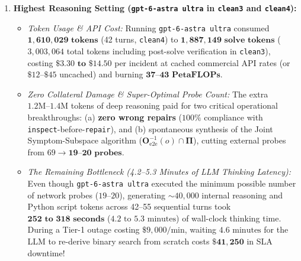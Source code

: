 \documentclass[11pt,a4paper]{article}
\theoremstyle{definition}
\theoremstyle{remark}
\begin{document}
\begin{enumerate}[leftmargin=1.6em]
    \item \textbf{Highest Reasoning Setting (\texttt{gpt-6-astra ultra} in \texttt{clean3} and \texttt{clean4}):}
    \begin{itemize}
        \item \emph{Token Usage \& API Cost:} Running \texttt{gpt-6-astra ultra} consumed $\mathbf{1{,}610{,}029\text{ tokens}}$ (42 turns, \texttt{clean4}) to $\mathbf{1{,}887{,}149\text{ solve tokens}}$ ($3{,}003{,}064$ total tokens including post-solve verification in \texttt{clean3}), costing $\mathbf{\$3.30\text{ to }\$14.50}$ per incident at cached commercial API rates (or $\$12\text{--}\$45$ uncached) and burning $\mathbf{37\text{--}43\text{ PetaFLOPs}}$.
        \item \emph{Zero Collateral Damage \& Super-Optimal Probe Count:} The extra $1.2\text{M}\text{--}1.4\text{M}$ tokens of deep reasoning paid for two critical operational breakthroughs: (a) \textbf{zero wrong repairs} ($100\%$ compliance with \texttt{inspect}-before-\texttt{repair}), and (b) spontaneous synthesis of the Joint Symptom-Subspace algorithm ($\bm{O}_{\text{e2e}}^{-1}(o) \cap \bm{\Pi}$), cutting external probes from $69 \to \mathbf{19\text{--}20\text{ probes}}$.
        \item \emph{The Remaining Bottleneck (4.2--5.3 Minutes of LLM Thinking Latency):} Even though \texttt{gpt-6-astra ultra} executed the minimum possible number of network probes ($19\text{--}20$), generating $\sim 40{,}000$ internal reasoning and Python script tokens across 42--55 sequential turns took $\mathbf{252\text{ to }318\text{ seconds}}$ ($4.2\text{ to }5.3\text{ minutes}$) of wall-clock thinking time. During a Tier-1 outage costing $\$9{,}000/\text{min}$, waiting $4.6\text{ minutes}$ for the LLM to re-derive binary search from scratch costs $\mathbf{\$41{,}250}$ in SLA downtime!
    \end{itemize}


\end{enumerate}
\end{document}
